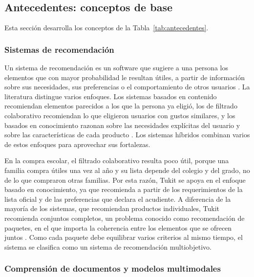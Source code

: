 \subsection{Antecedentes: conceptos de base}
\label{anx:antecedentes}

Esta sección desarrolla los conceptos de la Tabla~\ref{tab:antecedentes}.

\subsubsection{Sistemas de recomendación}

Un sistema de recomendación es un software que sugiere a una persona los elementos que con
mayor probabilidad le resultan útiles, a partir de información sobre sus necesidades, sus
preferencias o el comportamiento de otros usuarios \citep{adomavicius_toward_2005}. La
literatura distingue varios enfoques. Los sistemas basados en contenido recomiendan
elementos parecidos a los que la persona ya eligió, los de filtrado colaborativo recomiendan
lo que eligieron usuarios con gustos similares, y los basados en conocimiento razonan sobre
las necesidades explícitas del usuario y sobre las características de cada producto
\citep{burke_hybrid_2002}. Los sistemas híbridos combinan varios de estos enfoques para
aprovechar sus fortalezas.\par

En la compra escolar, el filtrado colaborativo resulta poco útil, porque una familia compra
útiles una vez al año y su lista depende del colegio y del grado, no de lo que compraron
otras familias. Por esta razón, Tukit se apoya en el enfoque basado en conocimiento, ya que
recomienda a partir de los requerimientos de la lista oficial y de las preferencias que
declara el acudiente. A diferencia de la mayoría de los sistemas, que recomiendan productos
individuales, Tukit recomienda conjuntos completos, un problema conocido como recomendación
de paquetes, en el que importa la coherencia entre los elementos que se ofrecen juntos
\citep{avny_brosh_bruce_2022}. Como cada paquete debe equilibrar varios criterios al mismo
tiempo, el sistema se clasifica como un sistema de recomendación multiobjetivo.\par

\subsubsection{Comprensión de documentos y modelos multimodales}

